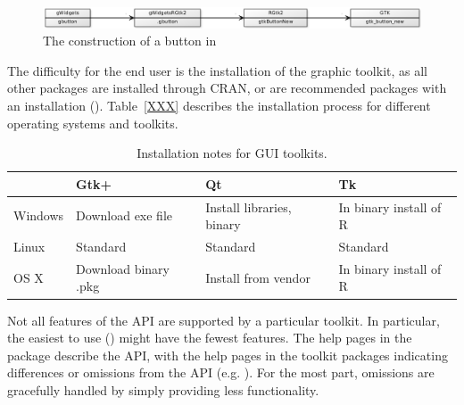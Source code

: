 \begin{figure}
  \centering
  \includegraphics[width=.95\textwidth]{fig-gWidgets-yuml}
  \caption{The construction of a button in }
  \label{fig:gWidgets-yuml}
\end{figure}


The difficulty for the end user is the installation of the graphic
toolkit, as all other packages are installed through CRAN, or are
recommended packages with an \R\/ installation
(). Table~\ref{XXX} describes the installation process for
different operating systems and toolkits.

\begin{table}
\centering
\label{tab:gWidgets-installation}
\caption{Installation notes for GUI toolkits.}
\begin{tabular}{@{}lp{}p{}p{}@{}}
\toprule

&Gtk+&Qt&Tk\\
\midrule
Windows&Download exe file&Install libraries, binary&In binary install of R\\Linux&Standard&Standard&Standard\\OS X&Download binary .pkg&Install from vendor&In binary install of R
\\ \bottomrule
\end{tabular}
\end{table}
Not all features of the API are supported by a particular toolkit. In
particular, the easiest to use () might have the
fewest features.  The help pages in the  package
describe the API, with the help pages in the toolkit packages
indicating differences or omissions from the API (e.g. ). For the most part,
omissions are gracefully handled by simply providing less
functionality.



